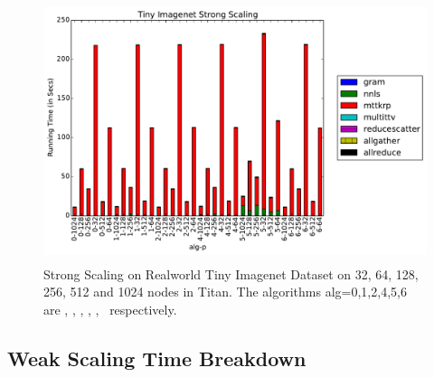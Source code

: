 \begin{figure}
\includegraphics[width=\textwidth, height=3in]{data/plots/ssrw_tinyimagenet_no16.pdf}
\caption {Strong Scaling on Realworld Tiny Imagenet Dataset on 32, 64, 128, 256, 512 and 1024 nodes in Titan. The algorithms alg=0,1,2,4,5,6 are \MU, \HALS, \BPP, \ADMM, \Nestrov, \CPALS\ respectively.}
\label{fig:synstrongscaling}
\end{figure}

\subsection{Weak Scaling Time Breakdown}

